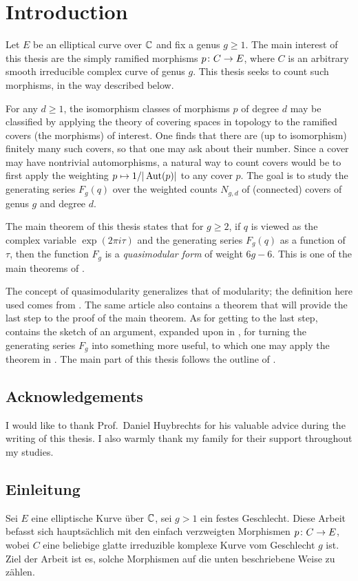 \section{Introduction}
Let $E$ be an elliptical curve over $\mathbb{C}$ and fix a genus $g\geq 1$.
The main interest of this thesis are the simply ramified morphisms $p\colon C\to E$, where $C$ is an arbitrary smooth irreducible complex curve of genus $g$. This thesis seeks to count such morphisms, in the way described below.

For any $d\geq 1$, the isomorphism classes of morphisms $p$ of degree $d$ may be classified by applying the theory of covering spaces in topology to the ramified covers (\ie the morphisms) of interest.
One finds that there are (up to isomorphism) finitely many such covers, so that one may ask about their number. Since a cover may have nontrivial automorphisms, a natural way to count covers would be to first apply the weighting $p\mapsto 1/|\operatorname{Aut}(p)|$ to any cover $p$.
The goal is to study the generating series $F_g(q)$ over the weighted counts $N_{g,d}$ of (connected) covers of genus $g$ and degree $d$.

The main theorem of this thesis states that for $g\geq 2$, if $q$ is viewed as the complex variable $\exp(2\pi i\tau)$ and the generating series $F_g(q)$ as a function of $\tau$, then the function $F_g$ is a \emph{quasimodular form} of weight $6g-6$. This is one of the main theorems of \cite{Dijkgraaf}.

The concept of quasimodularity generalizes that of modularity; the definition here used comes from \cite{Kaneko-Zagier1995}. The same article also contains a theorem that will provide the last step to the proof of the main theorem. As for getting to the last step, \cite{Dijkgraaf} contains the sketch of an argument, expanded upon in \cite{Roth}, for turning the generating series $F_g$ into something more useful, \ie to which one may apply the theorem in \cite{Kaneko-Zagier1995}. The main part of this thesis follows the outline of \cite{Roth}.


\subsection*{Acknowledgements}
I would like to thank Prof.\ Daniel Huybrechts for his valuable advice during the writing of this thesis. I also warmly thank my family for their support throughout my studies.


\subsection*{Einleitung}
Sei $E$ eine elliptische Kurve über $\mathbb{C}$, sei $g>1$ ein festes Geschlecht. Diese Arbeit befasst sich hauptsächlich mit den einfach verzweigten Morphismen $p\colon C\to E$, wobei $C$ eine beliebige glatte irreduzible komplexe Kurve vom Geschlecht $g$ ist. Ziel der Arbeit ist es, solche Morphismen auf die unten beschriebene Weise zu zählen.


